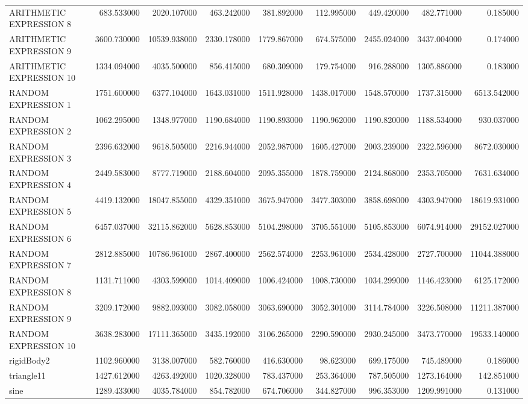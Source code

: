 \begin{longtable}{lrrrrrrrr}
ARITHMETIC EXPRESSION 8 & 683.533000 & 2020.107000 & 463.242000 & 381.892000 & 112.995000 & 449.420000 & 482.771000 & 0.185000 \\
ARITHMETIC EXPRESSION 9 & 3600.730000 & 10539.938000 & 2330.178000 & 1779.867000 & 674.575000 & 2455.024000 & 3437.004000 & 0.174000 \\
ARITHMETIC EXPRESSION 10 & 1334.094000 & 4035.500000 & 856.415000 & 680.309000 & 179.754000 & 916.288000 & 1305.886000 & 0.183000 \\
RANDOM EXPRESSION 1 & 1751.600000 & 6377.104000 & 1643.031000 & 1511.928000 & 1438.017000 & 1548.570000 & 1737.315000 & 6513.542000 \\
RANDOM EXPRESSION 2 & 1062.295000 & 1348.977000 & 1190.684000 & 1190.893000 & 1190.962000 & 1190.820000 & 1188.534000 & 930.037000 \\
RANDOM EXPRESSION 3 & 2396.632000 & 9618.505000 & 2216.944000 & 2052.987000 & 1605.427000 & 2003.239000 & 2322.596000 & 8672.030000 \\
RANDOM EXPRESSION 4 & 2449.583000 & 8777.719000 & 2188.604000 & 2095.355000 & 1878.759000 & 2124.868000 & 2353.705000 & 7631.634000 \\
RANDOM EXPRESSION 5 & 4419.132000 & 18047.855000 & 4329.351000 & 3675.947000 & 3477.303000 & 3858.698000 & 4303.947000 & 18619.931000 \\
RANDOM EXPRESSION 6 & 6457.037000 & 32115.862000 & 5628.853000 & 5104.298000 & 3705.551000 & 5105.853000 & 6074.914000 & 29152.027000 \\
RANDOM EXPRESSION 7 & 2812.885000 & 10786.961000 & 2867.400000 & 2562.574000 & 2253.961000 & 2534.428000 & 2727.700000 & 11044.388000 \\
RANDOM EXPRESSION 8 & 1131.711000 & 4303.599000 & 1014.409000 & 1006.424000 & 1008.730000 & 1034.299000 & 1146.423000 & 6125.172000 \\
RANDOM EXPRESSION 9 & 3209.172000 & 9882.093000 & 3082.058000 & 3063.690000 & 3052.301000 & 3114.784000 & 3226.508000 & 11211.387000 \\
RANDOM EXPRESSION 10 & 3638.283000 & 17111.365000 & 3435.192000 & 3106.265000 & 2290.590000 & 2930.245000 & 3473.770000 & 19533.140000 \\
rigidBody2 & 1102.960000 & 3138.007000 & 582.760000 & 416.630000 & 98.623000 & 699.175000 & 745.489000 & 0.186000 \\
triangle11 & 1427.612000 & 4263.492000 & 1020.328000 & 783.437000 & 253.364000 & 787.505000 & 1273.164000 & 142.851000 \\
sine & 1289.433000 & 4035.784000 & 854.782000 & 674.706000 & 344.827000 & 996.353000 & 1209.991000 & 0.131000 \\

\end{longtable}
